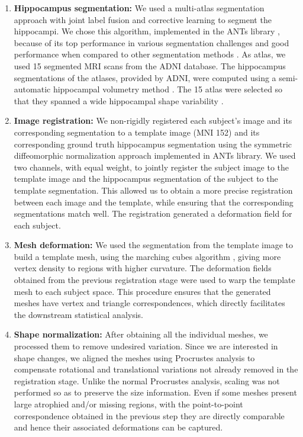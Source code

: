 \begin{enumerate}
    \item \textbf{Hippocampus segmentation:} We used a multi-atlas segmentation approach with joint label fusion and corrective learning \cite{Wang2013} to segment the hippocampi. We chose this algorithm, implemented in the ANTs library \cite{Avants2009}, because of its top performance in various segmentation challenges \cite{Wang2013} and good performance when compared to other segmentation methods \cite{Dill2015}. As atlas, we used 15 segmented MRI scans from the ADNI database. The hippocampus segmentations of the atlases, provided by ADNI, were computed using a semi-automatic hippocampal volumetry method \cite{Hsu2002}. The 15 atlas were selected so that they spanned a wide hippocampal shape variability \cite{Sanroma2014}. \\
    
    \item \textbf{Image registration:} We non-rigidly registered each subject's image and its corresponding segmentation to a template image (MNI 152) and its corresponding ground truth hippocampus segmentation using the symmetric diffeomorphic normalization approach \cite{Avants2008a} implemented in ANTs library. We used two channels, with equal weight, to jointly register the subject image to the template image and the hippocampus segmentation of the subject to the template segmentation. This allowed us to obtain a more precise registration between each image and the template, while ensuring that the corresponding segmentations match well. The registration generated a deformation field for each subject. \\
    
    \item \textbf{Mesh deformation:} We used the segmentation from the template image to build a template mesh, using the marching cubes algorithm \cite{Lorensen1987}, giving more vertex density to regions with higher curvature. The deformation fields obtained from the previous registration stage were used to warp the template mesh to each subject space. This procedure ensures that the generated meshes have vertex and triangle correspondences, which directly facilitates the downstream statistical analysis. \\

    \item \textbf{Shape normalization:} After obtaining all the individual meshes, we processed them to remove undesired variation. Since we are interested in shape changes, we aligned the meshes using Procrustes analysis \cite{Gower1975} to compensate rotational and translational variations not already removed in the registration stage. Unlike the normal Procrustes analysis, scaling was not performed so as to preserve the size information. Even if some meshes present large atrophied and/or missing regions, with the point-to-point correspondence obtained in the previous step they are directly comparable and hence their associated deformations can be captured.
    
\end{enumerate}

